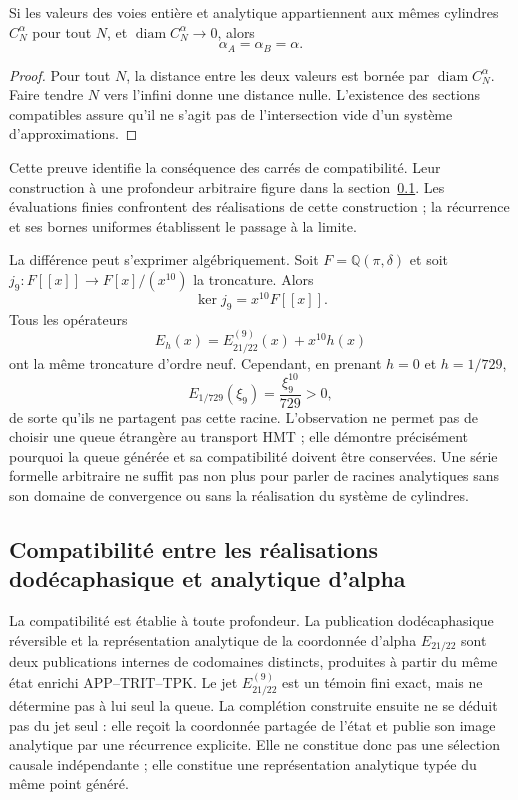 \begin{proposition}
\label{x_reciprocidad:prop:alpha-dos-limites}
Si les valeurs des voies entière et analytique appartiennent aux mêmes cylindres \(C_N^\alpha\) pour tout \(N\), et
\(\operatorname{diam}C_N^\alpha\to0\), alors
\[
 \alpha_A=\alpha_B=\alpha.
\]
\end{proposition}

\begin{proof}
Pour tout \(N\), la distance entre les deux valeurs est bornée
par \(\operatorname{diam}C_N^\alpha\). Faire tendre \(N\) vers l'infini
donne une distance nulle. L'existence des sections compatibles assure
qu'il ne s'agit pas de l'intersection vide d'un système d'approximations.
\end{proof}

Cette preuve identifie la conséquence des carrés de compatibilité.
Leur construction à une profondeur arbitraire figure dans la
section~\ref{x_reciprocidad:subsec:alpha-publicaciones-completas}. Les évaluations
finies confrontent des réalisations de cette construction ; la récurrence
et ses bornes uniformes établissent le passage à la limite.

La différence peut s'exprimer algébriquement. Soit \(F=\mathbb Q(\pi,\delta)\) et soit \(j_9:F[[x]]\to F[x]/(x^{10})\) la troncature. Alors
\[
 \ker j_9=x^{10}F[[x]].
\]
Tous les opérateurs
\[
 E_h(x)=E_{21/22}^{(9)}(x)+x^{10}h(x)
\]
ont la même troncature d'ordre neuf. Cependant, en prenant
\(h=0\) et \(h=1/729\),
\[
 E_{1/729}(\xi_9)=\frac{\xi_9^{10}}{729}>0,
\]
de sorte qu'ils ne partagent pas cette racine. L'observation ne permet pas de choisir une queue étrangère au transport HMT ; elle démontre précisément pourquoi la queue générée et sa compatibilité doivent être conservées. Une série formelle arbitraire ne suffit pas non plus pour parler de racines analytiques sans son domaine de convergence ou sans la réalisation du système de cylindres.

\subsection{Compatibilité entre les réalisations dodécaphasique et analytique d’alpha}
\label{x_reciprocidad:subsec:alpha-publicaciones-completas}

La compatibilité est établie à toute profondeur. La publication
dodécaphasique réversible et la représentation analytique de la
coordonnée d'alpha
\(E_{21/22}\) sont deux publications internes de codomaines distincts,
produites à partir du même état enrichi APP--TRIT--TPK. Le jet
\(E_{21/22}^{(9)}\) est un témoin fini exact, mais ne détermine pas à lui seul
la queue. La complétion construite ensuite ne se déduit pas du jet
seul : elle reçoit la coordonnée partagée de l'état et publie son image
analytique par une récurrence explicite. Elle ne constitue donc pas une
sélection causale indépendante ; elle constitue une représentation analytique
typée du même point généré.

